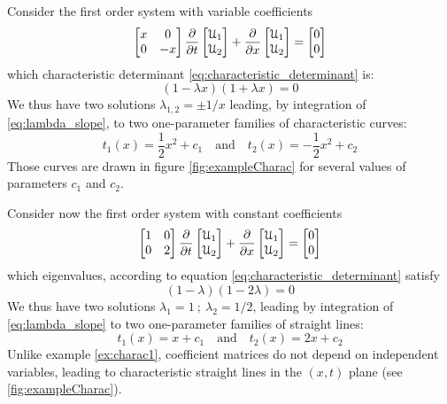 \begin{example}
  \label{ex:charac1}
  Consider the first order system with variable coefficients
\begin{equation*}
 \left[\begin{matrix}x &0 \\0 &-x\end{matrix}\right] \frac{\partial }{\partial t} \left[\begin{matrix}\mathcal{U}_1 \\ \mathcal{U}_2\end{matrix}\right] + \frac{\partial }{\partial x}\left[\begin{matrix}\mathcal{U}_1 \\ \mathcal{U}_2\end{matrix}\right] = \left[\begin{matrix}0 \\0\end{matrix}\right]
\end{equation*}
which characteristic determinant \eqref{eq:characteristic_determinant} is:
\begin{equation*}
  (1-\lambda x)(1+\lambda x)=0
\end{equation*}
We thus have two solutions $\lambda_{1,2}=\pm 1/x$ leading, by integration of \eqref{eq:lambda_slope}, to two one-parameter families of characteristic curves:
\begin{equation*}
  t_1(x)=\frac{1}{2}x^2+c_1  \quad \text{and} \quad t_2(x)=-\frac{1}{2}x^2+c_2 
\end{equation*}
Those curves are drawn in figure \ref{fig:exampleCharac} for several values of parameters $c_1$ and $c_2$.
\end{example}
\begin{example}
  \label{ex:charac2}
  Consider now the first order system with constant coefficients
\begin{equation*}
 \left[\begin{matrix}1 &0 \\0 &2\end{matrix}\right] \frac{\partial }{\partial t} \left[\begin{matrix}\mathcal{U}_1 \\ \mathcal{U}_2\end{matrix}\right] + \frac{\partial }{\partial x}\left[\begin{matrix}\mathcal{U}_1 \\ \mathcal{U}_2\end{matrix}\right] = \left[\begin{matrix}0 \\0\end{matrix}\right]
\end{equation*}
which eigenvalues, according to equation \eqref{eq:characteristic_determinant} satisfy
\begin{equation*}
  (1 - \lambda )(1- 2\lambda)=0
\end{equation*}
We thus have two solutions $\lambda_1=1 \: ; \: \lambda_2=1/2$, leading by integration of \eqref{eq:lambda_slope} to two one-parameter families of straight lines:
\begin{equation*}
  t_1(x)=x+c_1  \quad \text{and} \quad t_2(x)=2x+c_2 
\end{equation*}
Unlike example \ref{ex:charac1}, coefficient matrices do not depend on independent variables, leading to characteristic straight lines in the $(x,t)$ plane (see \ref{fig:exampleCharac}).
\end{example}

